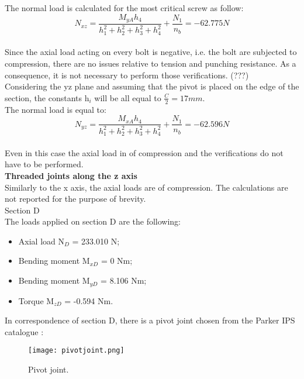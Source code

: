 The normal load is calculated for the most critical screw as follow:\\
\begin{equation}
    N_{xz} = \frac{M_{yA}h_{4}}{h_{1}^{2}+h_{2}^{2}+h_{3}^{2}+h_{4}^{2}} + \frac{N_{1}}{n_{b}} = -62.775 N
\end{equation}\\
Since the axial load acting on every bolt is negative, i.e. the bolt are subjected to compression, there are no issues relative to tension and punching resistance. As a consequence, it is not necessary to perform those verifications. (???) \\
Considering the yz plane and assuming that the pivot is placed on the edge of the section, the constants h$_{i}$ will be all equal to $\frac{C}{2} = 17 mm$.\\
The normal load is equal to:\\
\begin{equation}
    N_{yz} = \frac{M_{xA}h_{4}}{h_{1}^{2}+h_{2}^{2}+h_{3}^{2}+h_{4}^{2}} + \frac{N_{1}}{n_{b}} = -62.596 N
\end{equation}\\
Even in this case the axial load in of compression and the verifications do not have to be performed. \vspace{5mm} \\
\textbf{Threaded joints along the z axis}\\
Similarly to the x axis, the axial loads are of compression. The calculations are not reported for the purpose of brevity.\\
Section D\\
The loads applied on section D are the following:\\
\begin{itemize}
\item Axial load N$_{D}$ = 233.010 N;
\item Bending moment M$_{xD}$ = 0 Nm; 
\item Bending moment M$_{yD}$ = 8.106 Nm; 
\item Torque M$_{zD}$ = -0.594 Nm.
\end{itemize}
In correspondence of section D, there is a pivot joint chosen from the Parker IPS catalogue \cite{parker-ds}:\\
\begin{figure}[h!]
    \centering
    \texttt{[image: pivotjoint.png]}
    \caption{Pivot joint.}
    \label{fig: pivot}
\end{figure}\\
